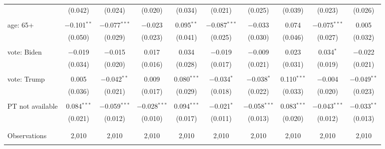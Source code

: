 \begin{tabular}{@{\extracolsep{5pt}}lccccccccc}
  & (0.042) & (0.024) & (0.020) & (0.034) & (0.021) & (0.025) & (0.039) & (0.023) & (0.026) \\ 
  & & & & & & & & & \\ 
 age: 65+ & $-$0.101$^{**}$ & $-$0.077$^{***}$ & $-$0.023 & 0.095$^{**}$ & $-$0.087$^{***}$ & $-$0.033 & 0.074 & $-$0.075$^{***}$ & 0.005 \\ 
  & (0.050) & (0.029) & (0.023) & (0.041) & (0.025) & (0.030) & (0.046) & (0.027) & (0.032) \\ 
  & & & & & & & & & \\ 
 vote: Biden & $-$0.019 & $-$0.015 & 0.017 & 0.034 & $-$0.019 & $-$0.009 & 0.023 & 0.034$^{*}$ & $-$0.022 \\ 
  & (0.034) & (0.020) & (0.016) & (0.028) & (0.017) & (0.021) & (0.031) & (0.019) & (0.021) \\ 
  & & & & & & & & & \\ 
 vote: Trump & 0.005 & $-$0.042$^{**}$ & 0.009 & 0.080$^{***}$ & $-$0.034$^{*}$ & $-$0.038$^{*}$ & 0.110$^{***}$ & $-$0.004 & $-$0.049$^{**}$ \\ 
  & (0.036) & (0.021) & (0.017) & (0.029) & (0.018) & (0.022) & (0.033) & (0.020) & (0.023) \\ 
  & & & & & & & & & \\ 
 PT not available & 0.084$^{***}$ & $-$0.059$^{***}$ & $-$0.028$^{***}$ & 0.094$^{***}$ & $-$0.021$^{*}$ & $-$0.058$^{***}$ & 0.083$^{***}$ & $-$0.043$^{***}$ & $-$0.033$^{**}$ \\ 
  & (0.021) & (0.012) & (0.010) & (0.017) & (0.011) & (0.013) & (0.020) & (0.012) & (0.013) \\ 
  & & & & & & & & & \\ 
\hline \\[-1.8ex] 

Observations & 2,010 & 2,010 & 2,010 & 2,010 & 2,010 & 2,010 & 2,010 & 2,010 & 2,010 \\ 
\hline 
\hline \\[-1.8ex] 
\end{tabular} 